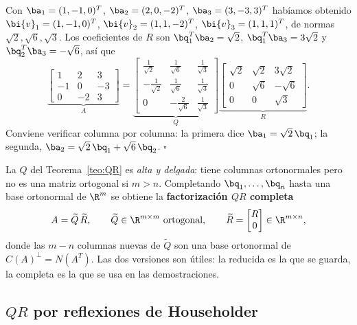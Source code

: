 \begin{ejemplo}
Con $\ba_1=(1,-1,0)^T$, $\ba_2=(2,0,-2)^T$, $\ba_3=(3,-3,3)^T$ habíamos
obtenido $\bi{v}_1=(1,-1,0)^T$, $\bi{v}_2=(1,1,-2)^T$,
$\bi{v}_3=(1,1,1)^T$, de normas $\sqrt2,\sqrt6,\sqrt3$. Los coeficientes de
$R$ son $\bq_1^T\ba_2=\sqrt2$, $\bq_1^T\ba_3=3\sqrt2$ y
$\bq_2^T\ba_3=-\sqrt6$, así que
\[
\underbrace{\begin{bmatrix}1&2&3\\-1&0&-3\\0&-2&3\end{bmatrix}}_{A}
=
\underbrace{\begin{bmatrix}
\tfrac{1}{\sqrt2}&\tfrac{1}{\sqrt6}&\tfrac{1}{\sqrt3}\\[2pt]
-\tfrac{1}{\sqrt2}&\tfrac{1}{\sqrt6}&\tfrac{1}{\sqrt3}\\[2pt]
0&-\tfrac{2}{\sqrt6}&\tfrac{1}{\sqrt3}
\end{bmatrix}}_{Q}
\underbrace{\begin{bmatrix}
\sqrt2&\sqrt2&3\sqrt2\\ 0&\sqrt6&-\sqrt6\\ 0&0&\sqrt3
\end{bmatrix}}_{R} .
\]
Conviene verificar columna por columna: la primera dice
$\ba_1=\sqrt2\,\bq_1$; la segunda, $\ba_2=\sqrt2\,\bq_1+\sqrt6\,\bq_2$.
\hfill$\square$
\end{ejemplo}

\begin{observacion}[$QR$ completa]\label{obs:QR-completa}
La $Q$ del Teorema~\ref{teo:QR} es \emph{alta y delgada}: tiene columnas
ortonormales pero no es una matriz ortogonal si $m>n$. Completando
$\bq_1,\dots,\bq_n$ hasta una base ortonormal de $\R^m$ se obtiene la
\textbf{factorización $QR$ completa}
\[
A=\widetilde{Q}\,\widetilde{R},
\qquad
\widetilde{Q}\in\R^{m\times m}\ \text{ortogonal},
\qquad
\widetilde{R}=\begin{bmatrix}R\\ 0\end{bmatrix}\in\R^{m\times n},
\]
donde las $m-n$ columnas nuevas de $\widetilde{Q}$ son una base ortonormal
de $C(A)^{\perp}=N(A^T)$. Las dos versiones son útiles: la reducida es la que
se guarda, la completa es la que se usa en las demostraciones.
\end{observacion}

\subsection*{$QR$ por reflexiones de Householder}


